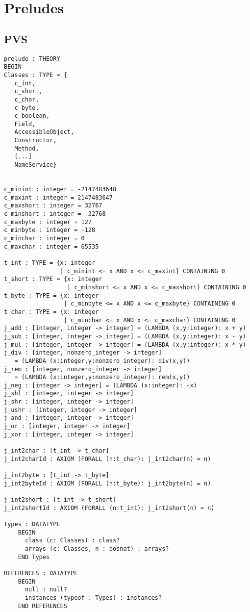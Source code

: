 \chapter{Preludes}
\section{PVS}
 \begin{verbatim}
prelude : THEORY
BEGIN
Classes : TYPE = {
   c_int,
   c_short,
   c_char,
   c_byte,
   c_boolean,
   Field,
   AccessibleObject,
   Constructor,
   Method,
   [...]
   NameService}


c_minint : integer = -2147483648
c_maxint : integer = 2147483647
c_maxshort : integer = 32767
c_minshort : integer = -32768
c_maxbyte : integer = 127
c_minbyte : integer = -128
c_minchar : integer = 0
c_maxchar : integer = 65535

t_int : TYPE = {x: integer 
                | c_minint <= x AND x <= c_maxint} CONTAINING 0
t_short : TYPE = {x: integer 
                  | c_minshort <= x AND x <= c_maxshort} CONTAINING 0
t_byte : TYPE = {x: integer 
                 | c_minbyte <= x AND x <= c_maxbyte} CONTAINING 0
t_char : TYPE = {x: integer 
                 | c_minchar <= x AND x <= c_maxchar} CONTAINING 0
j_add : [integer, integer -> integer] = (LAMBDA (x,y:integer): x + y)
j_sub : [integer, integer -> integer] = (LAMBDA (x,y:integer): x - y)
j_mul : [integer, integer -> integer] = (LAMBDA (x,y:integer): x * y)
j_div : [integer, nonzero_integer -> integer] 
   = (LAMBDA (x:integer,y:nonzero_integer): div(x,y))
j_rem : [integer, nonzero_integer -> integer] 
   = (LAMBDA (x:integer,y:nonzero_integer): rem(x,y))
j_neg : [integer -> integer] = (LAMBDA (x:integer): -x)
j_shl : [integer, integer -> integer]
j_shr : [integer, integer -> integer]
j_ushr : [integer, integer -> integer]
j_and : [integer, integer -> integer]
j_or : [integer, integer -> integer]
j_xor : [integer, integer -> integer]

j_int2char : [t_int -> t_char]
j_int2charId : AXIOM (FORALL (n:t_char): j_int2char(n) = n)

j_int2byte : [t_int -> t_byte]
j_int2byteId : AXIOM (FORALL (n:t_byte): j_int2byte(n) = n)

j_int2short : [t_int -> t_short]
j_int2shortId : AXIOM (FORALL (n:t_int): j_int2short(n) = n)

Types : DATATYPE
    BEGIN
      class (c: Classes) : class?
      arrays (c: Classes, n : posnat) : arrays?
    END Types

REFERENCES : DATATYPE
    BEGIN
      null : null?
      instances (typeof : Types) : instances?
    END REFERENCES


\end{verbatim}

